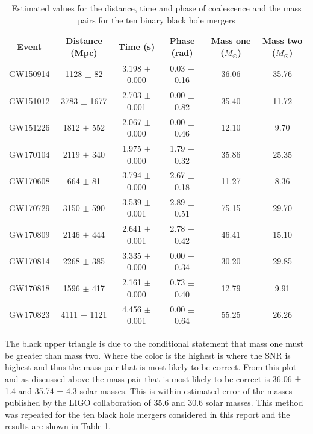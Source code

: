 \documentclass[]{article}
\begin{document}
\begin{table}[h]
    \begin{center}
        \begin{tabular}{|c c c c c c|}
            \hline
            Event & Distance (Mpc) & Time (s) & Phase (rad) & Mass one ($M_{\odot}$) & Mass two ($M_{\odot}$)\\
            \hline
            GW150914 & 1128 $\pm$ 82 & 3.198 $\pm$ 0.000 & 0.03 $\pm$ 0.16 & 36.06 & 35.76 \\
            GW151012 & 3783 $\pm$ 1677 & 2.703 $\pm$ 0.001 & 0.00 $\pm$ 0.82 & 35.40 & 11.72 \\
            GW151226 & 1812 $\pm$ 552 & 2.067 $\pm$ 0.000 & 0.00 $\pm$ 0.46 & 12.10 & 9.70 \\
            GW170104 & 2119 $\pm$ 340 & 1.975 $\pm$ 0.000 & 1.79 $\pm$ 0.32 & 35.86 & 25.35 \\
            GW170608 & 664 $\pm$ 81 & 3.794 $\pm$ 0.000 & 2.67 $\pm$ 0.18 & 11.27 & 8.36 \\
            GW170729 & 3150 $\pm$ 590 & 3.539 $\pm$ 0.001 & 2.89 $\pm$ 0.51 & 75.15 & 29.70 \\
            GW170809 & 2146 $\pm$ 444 & 2.641 $\pm$ 0.001 & 2.78 $\pm$ 0.42 & 46.41 & 15.10 \\
            GW170814 & 2268 $\pm$ 385 & 3.335 $\pm$ 0.000 & 0.00 $\pm$ 0.34 & 30.20 & 29.85 \\
            GW170818 & 1596 $\pm$ 417 & 2.161 $\pm$ 0.000 & 0.73 $\pm$ 0.40 & 12.79 & 9.91 \\
            GW170823 & 4111 $\pm$ 1121 & 4.456 $\pm$ 0.001 & 0.00 $\pm$ 0.64 & 55.25 & 26.26 \\
            \hline
        \end{tabular}
        \caption{Estimated values for the distance, time and phase of coalescence and the mass pairs for the ten binary black hole mergers}
        \label{tab:estimates}
    \end{center}
\end{table}

The black upper triangle is due to the conditional statement that mass one must be greater than mass two. Where the
color is the highest is where the SNR is highest and thus the mass pair that is most likely
to be correct. From this plot and as discussed above the mass pair that is most likely to
be correct is 36.06 ± 1.4 and 35.74 ± 4.3 solar masses. This is within estimated error of the masses published
by the LIGO collaboration of 35.6 and 30.6 solar masses. This method was repeated for the ten
black hole mergers considered in this report and the results are shown in Table 1.
\end{document}
